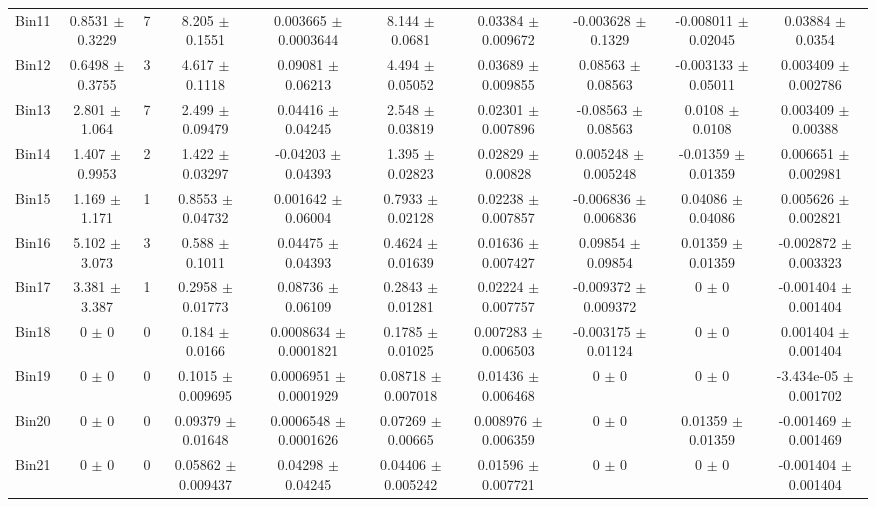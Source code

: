 \begin{tabular}{@{\extracolsep{4pt}}lccccccccc@{}}
     Bin11 & 0.8531 $\pm$ 0.3229 & 7 & 8.205 $\pm$ 0.1551 & 0.003665 $\pm$ 0.0003644 & 8.144 $\pm$ 0.0681 & 0.03384 $\pm$ 0.009672 & -0.003628 $\pm$ 0.1329 & -0.008011 $\pm$ 0.02045 & 0.03884 $\pm$ 0.0354 \\ 
     Bin12 & 0.6498 $\pm$ 0.3755 & 3 & 4.617 $\pm$ 0.1118 & 0.09081 $\pm$ 0.06213 & 4.494 $\pm$ 0.05052 & 0.03689 $\pm$ 0.009855 & 0.08563 $\pm$ 0.08563 & -0.003133 $\pm$ 0.05011 & 0.003409 $\pm$ 0.002786 \\ 
     Bin13 & 2.801 $\pm$ 1.064 & 7 & 2.499 $\pm$ 0.09479 & 0.04416 $\pm$ 0.04245 & 2.548 $\pm$ 0.03819 & 0.02301 $\pm$ 0.007896 & -0.08563 $\pm$ 0.08563 & 0.0108 $\pm$ 0.0108 & 0.003409 $\pm$ 0.00388 \\ 
     Bin14 & 1.407 $\pm$ 0.9953 & 2 & 1.422 $\pm$ 0.03297 & -0.04203 $\pm$ 0.04393 & 1.395 $\pm$ 0.02823 & 0.02829 $\pm$ 0.00828 & 0.005248 $\pm$ 0.005248 & -0.01359 $\pm$ 0.01359 & 0.006651 $\pm$ 0.002981 \\ 
     Bin15 & 1.169 $\pm$ 1.171 & 1 & 0.8553 $\pm$ 0.04732 & 0.001642 $\pm$ 0.06004 & 0.7933 $\pm$ 0.02128 & 0.02238 $\pm$ 0.007857 & -0.006836 $\pm$ 0.006836 & 0.04086 $\pm$ 0.04086 & 0.005626 $\pm$ 0.002821 \\ 
     Bin16 & 5.102 $\pm$ 3.073 & 3 & 0.588 $\pm$ 0.1011 & 0.04475 $\pm$ 0.04393 & 0.4624 $\pm$ 0.01639 & 0.01636 $\pm$ 0.007427 & 0.09854 $\pm$ 0.09854 & 0.01359 $\pm$ 0.01359 & -0.002872 $\pm$ 0.003323 \\ 
     Bin17 & 3.381 $\pm$ 3.387 & 1 & 0.2958 $\pm$ 0.01773 & 0.08736 $\pm$ 0.06109 & 0.2843 $\pm$ 0.01281 & 0.02224 $\pm$ 0.007757 & -0.009372 $\pm$ 0.009372 & 0 $\pm$ 0 & -0.001404 $\pm$ 0.001404 \\ 
     Bin18 & 0 $\pm$ 0 & 0 & 0.184 $\pm$ 0.0166 & 0.0008634 $\pm$ 0.0001821 & 0.1785 $\pm$ 0.01025 & 0.007283 $\pm$ 0.006503 & -0.003175 $\pm$ 0.01124 & 0 $\pm$ 0 & 0.001404 $\pm$ 0.001404 \\ 
     Bin19 & 0 $\pm$ 0 & 0 & 0.1015 $\pm$ 0.009695 & 0.0006951 $\pm$ 0.0001929 & 0.08718 $\pm$ 0.007018 & 0.01436 $\pm$ 0.006468 & 0 $\pm$ 0 & 0 $\pm$ 0 & -3.434e-05 $\pm$ 0.001702 \\ 
     Bin20 & 0 $\pm$ 0 & 0 & 0.09379 $\pm$ 0.01648 & 0.0006548 $\pm$ 0.0001626 & 0.07269 $\pm$ 0.00665 & 0.008976 $\pm$ 0.006359 & 0 $\pm$ 0 & 0.01359 $\pm$ 0.01359 & -0.001469 $\pm$ 0.001469 \\ 
     Bin21 & 0 $\pm$ 0 & 0 & 0.05862 $\pm$ 0.009437 & 0.04298 $\pm$ 0.04245 & 0.04406 $\pm$ 0.005242 & 0.01596 $\pm$ 0.007721 & 0 $\pm$ 0 & 0 $\pm$ 0 & -0.001404 $\pm$ 0.001404 \\ 

\end{tabular}
